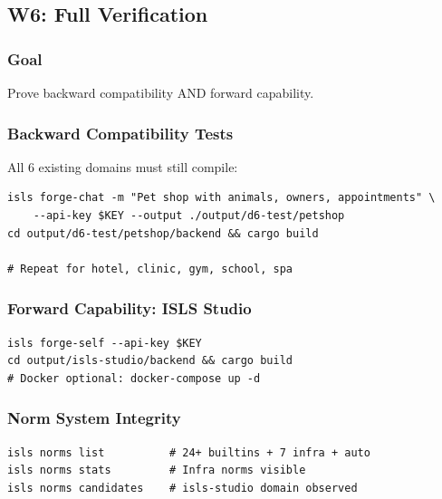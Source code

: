 \documentclass[11pt,a4paper]{article}
\begin{document}
\subsection{W6: Full Verification}
\label{sec:w6}

\subsubsection{Goal}

Prove backward compatibility AND forward capability.

\subsubsection{Backward Compatibility Tests}

All 6 existing domains must still compile:

\begin{lstlisting}[style=bash]
isls forge-chat -m "Pet shop with animals, owners, appointments" \
    --api-key $KEY --output ./output/d6-test/petshop
cd output/d6-test/petshop/backend && cargo build

# Repeat for hotel, clinic, gym, school, spa
\end{lstlisting}

\subsubsection{Forward Capability: ISLS Studio}

\begin{lstlisting}[style=bash]
isls forge-self --api-key $KEY
cd output/isls-studio/backend && cargo build
# Docker optional: docker-compose up -d
\end{lstlisting}

\subsubsection{Norm System Integrity}

\begin{lstlisting}[style=bash]
isls norms list          # 24+ builtins + 7 infra + auto
isls norms stats         # Infra norms visible
isls norms candidates    # isls-studio domain observed
\end{lstlisting}


\end{document}
